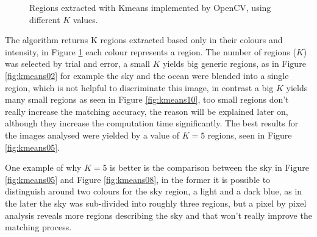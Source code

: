 \documentclass[12pt,a4paper]{article}
\begin{document}
\begin{figure}[!h]
{{		}
		\label{fig:kmeans08}
	}
	\quad
	\caption{Regions extracted with Kmeans implemented by OpenCV, using different $K$ values.}
	\label{fig:kmeans}
\end{figure}

	The algorithm returns K regions extracted based only in their colours and intensity, in Figure \ref{fig:kmeans} each colour represents a region. The number of regions ($K$) was selected by trial and error, a small $K$ yields big generic regions, as in Figure \ref{fig:kmeans02} for example the sky and the ocean were blended into a single region, which is not helpful to discriminate this image, in contrast a big $K$ yields many small regions as seen in Figure \ref{fig:kmeans10},  too small regions don't really increase the matching accuracy, the reason will be explained later on, although they increase the computation time significantly. The best results for the images analysed were yielded by a value of $K = 5$ regions, seen in Figure \ref{fig:kmeans05}.

	One example of why $K = 5$ is better is the comparison between the sky in Figure \ref{fig:kmeans05} and Figure \ref{fig:kmeans08}, in the former it is possible to distinguish around two colours for the sky region, a light and a dark blue, as in the later the sky was sub-divided into roughly three regions, but a pixel by pixel analysis reveals more regions describing the sky and that won't really improve the matching process.
\end{document}
